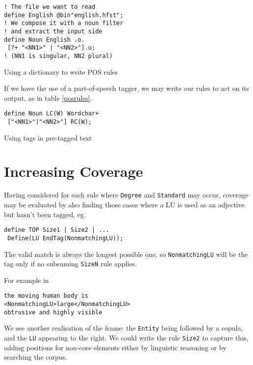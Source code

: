 \documentclass[11pt]{article}
\begin{document}
\begin{table}[h]
\small
  \begin{framed}
\begin{verbatim}
! The file we want to read
define English @bin"english.hfst";
! We compose it with a noun filter
! and extract the input side
define Noun English .o.
 [?+ "<NN1>" | "<NN2>"].u;
! (NN1 is singular, NN2 plural)
\end{verbatim}
\end{framed}
  \normalsize
  \caption{Using a dictionary to write POS rules}
  \label{dictrules}
  \end{table}

If we have the use of a part-of-speech tagger, we may write our rules to act
on its output, as in table \ref{posrules}.

\begin{table}[h]
  \small
  \begin{framed}
\begin{verbatim}
define Noun LC(W) Wordchar+
 ["<NN1>"|"<NN2>"] RC(W);
\end{verbatim}
\end{framed}
  \normalsize
  \caption{Using tags in pre-tagged text}
  \label{posrules}
  \end{table}

\section{Increasing Coverage}
Having considered for each rule where \verb+Degree+ and \verb+Standard+ may occur, coverage may be evaluated by also finding those cases where a LU is used as an adjective but hasn't been tagged, eg.

\small
\begin{verbatim}
define TOP Size1 | Size2 | ...
 Define(LU EndTag(NonmatchingLU));
\end{verbatim}
\normalsize

The valid match is always the longest possible one, so \verb+NonmatchingLU+ will be the tag only if no subsuming \verb+SizeN+ rule applies.

For example in

\small
\begin{framed}
\begin{verbatim}
the moving human body is
<NonmatchingLU>large</NonmatchingLU>
obtrusive and highly visible
\end{verbatim}
\end{framed}
\normalsize

We see another realisation of the frame: the \verb+Entity+ being followed by a
copula, and the \verb+LU+ appearing to the right. We could write the rule
\verb+Size2+ to capture this, adding positions for non-core elements either by
linguistic reasoning or by searching the corpus.



\end{document}
